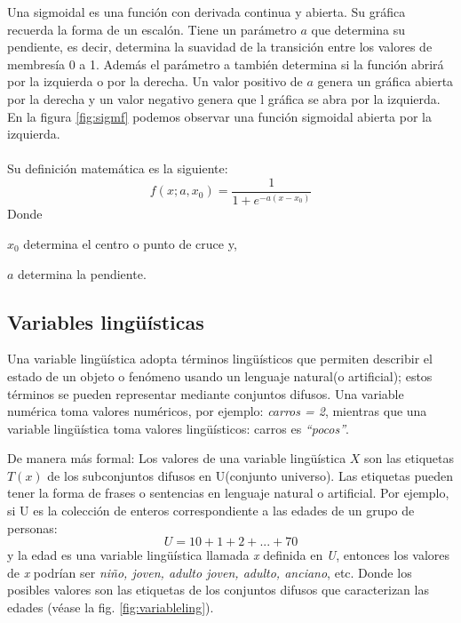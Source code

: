 Una sigmoidal es una función con derivada continua y abierta. Su gráfica recuerda la forma de un escalón. Tiene un parámetro $a$ que determina su pendiente, es decir, determina la suavidad de la transición entre los valores de membresía 0 a 1. Además el parámetro a también determina si la función abrirá por la izquierda o por la derecha. Un valor positivo de $a$ genera un gráfica abierta por la derecha
y un valor negativo genera que l gráfica se abra por la izquierda.
En la figura \ref{fig:sigmf} podemos observar una función sigmoidal abierta por la izquierda.\\\\
Su definición matemática es la siguiente:
\begin{displaymath}
	f(x;a,x_0) = \frac{1}{1+e^{-a(x-x_0)}}
\end{displaymath}
Donde
{\setlength{\baselineskip}{0.7\baselineskip}\begin{description}
	\item $x_0$ determina el centro o punto de cruce y,
	\item $a$ determina la pendiente.
\end{description}}

\subsection{Variables lingüísticas}
Una variable lingüística adopta términos lingüísticos que permiten describir el estado de un objeto o fenómeno usando un lenguaje natural(o artificial); estos términos se pueden representar mediante conjuntos difusos. Una variable numérica toma valores numéricos, por ejemplo: \textit{carros = 2}, mientras que una variable lingüística toma valores lingüísticos: carros es \textit{``pocos''}.

De manera más formal: Los valores de una variable lingüística $X$ son las etiquetas $T(x)$ de los subconjuntos difusos en U(conjunto universo). Las etiquetas pueden tener la forma de frases o sentencias en lenguaje natural o artificial. Por ejemplo, si U es la colección de enteros correspondiente a las edades de un grupo de personas:
$$U = 10 + 1 + 2 + ... + 70$$
y la edad es una variable lingüística llamada \textit{x} definida en \textit{U}, entonces los valores de \textit{x} podrían ser \textit{niño, joven, adulto joven, adulto, anciano}, etc. Donde los posibles valores son las etiquetas de los conjuntos difusos que caracterizan las edades (véase la fig. \ref{fig:variableling}).


